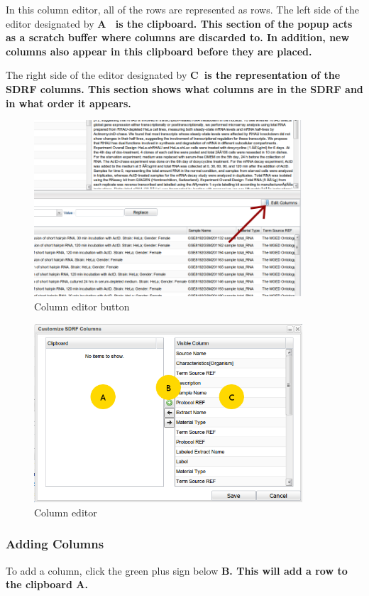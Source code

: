 \documentclass[a4paper]{article}
\begin{document}
In this column editor, all of the rows are represented as rows. The left side of the editor designated by \bf{A}\rm~ is the clipboard. This section of the popup acts as a scratch buffer where columns are discarded to. In addition, new columns also appear in this clipboard before they are placed. 

The right side of the editor designated by \bf{C}\rm ~is the representation of the SDRF columns. This section shows what columns are in the SDRF and in what order it appears.

\begin{figure}[h]
\caption{Column editor button}
\centering
\label{columneditbutton}
\includegraphics[width=10cm]{images/ColumnEditor}
\end{figure}

\begin{figure}[h]
\caption{Column editor}
\centering
\label{columneditor}
\includegraphics[width=10cm]{images/ceditor}
\end{figure}
\newpage
\subsubsection*{Adding Columns}
To add a column, click the green plus sign below \bf{B}\rm. This will add a row to the clipboard \bf{A}\rm.
\end{document}
